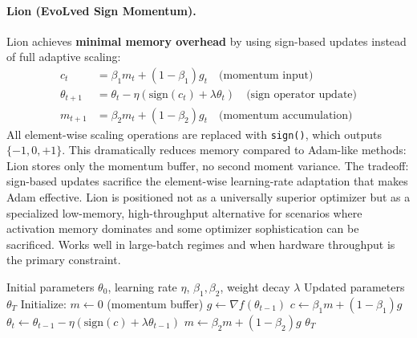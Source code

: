 \documentclass[11pt,a4paper]{article}
\begin{document}
\paragraph{Lion (EvoLved Sign Momentum).}
Lion achieves \textbf{minimal memory overhead} by using sign-based updates instead of full adaptive scaling:\begin{align}
c_t &= \beta_1 m_t + (1-\beta_1) g_t \quad\text{(momentum input)} \\
\theta_{t+1} &= \theta_t - \eta \left(\text{sign}(c_t) + \lambda\theta_t\right) \quad\text{(sign operator update)} \\
m_{t+1} &= \beta_2 m_t + (1-\beta_2) g_t \quad\text{(momentum accumulation)}
\end{align}
All element-wise scaling operations are replaced with \texttt{sign()}, which outputs $\{-1, 0, +1\}$. This dramatically reduces memory compared to Adam-like methods: Lion stores only the momentum buffer, no second moment variance. The tradeoff: sign-based updates sacrifice the element-wise learning-rate adaptation that makes Adam effective. Lion is positioned not as a universally superior optimizer but as a specialized low-memory, high-throughput alternative for scenarios where activation memory dominates and some optimizer sophistication can be sacrificed. Works well in large-batch regimes and when hardware throughput is the primary constraint.

\begin{algorithm}[H]
\caption{Lion (EvoLved Sign Momentum)}
\label{alg:lion}
\begin{algorithmic}[1]
\Require Initial parameters $\theta_0$, learning rate $\eta$, $\beta_1, \beta_2$, weight decay $\lambda$
\Ensure Updated parameters $\theta_T$
\State Initialize: $m \gets 0$ (momentum buffer)
    \State $g \gets \nabla f(\theta_{t-1})$ 
    \State $c \gets \beta_1 m + (1-\beta_1) g$ 
    \State $\theta_t \gets \theta_{t-1} - \eta (\text{sign}(c) + \lambda \theta_{t-1})$ 
    \State $m \gets \beta_2 m + (1-\beta_2) g$ 
\EndFor
\Return $\theta_T$
\end{algorithmic}
\end{algorithm}
\end{document}

